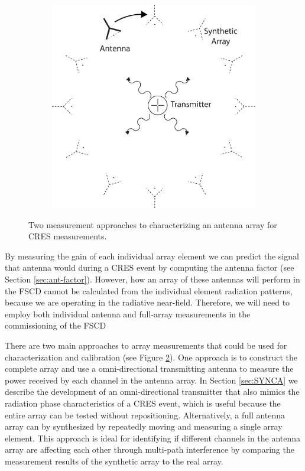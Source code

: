 \begin{figure}[htbp]
\begin{subfigure}[b]{0.4\textwidth}
        \includegraphics[width=1\textwidth]{figs/Chapter-5/230409_beamform_synth_array_meas.png}
        \caption{\label{fig:beam-synth-array-meas}}
    \end{subfigure}
    \hfill
    \caption{Two measurement approaches to characterizing an antenna array for CRES measurements.}
    \qquad
    \label{fig:array-measurements}
\end{figure}
By measuring the gain of each individual array element we can predict the signal that antenna would during a CRES event by computing the antenna factor (see Section \ref{sec:ant-factor}). However, how an array of these antennas will perform in the FSCD cannot be calculated from the individual element radiation patterns, because we are operating in the radiative near-field. Therefore, we will need to employ both individual antenna and full-array measurements in the commissioning of the FSCD

There are two main approaches to array measurements that could be used for characterization and calibration (see Figure \ref{fig:array-measurements}). One approach is to construct the complete array and use a omni-directional transmitting antenna to measure the power received by each channel in the antenna array. In Section \ref{sec:SYNCA} we describe the development of an omni-directional transmitter that also mimics the radiation phase characteristics of a CRES event, which is useful because the entire array can be tested without repositioning. Alternatively, a full antenna array can by synthesized by repeatedly moving and measuring a single array element. This approach is ideal for identifying if different channels in the antenna array are affecting each other through multi-path interference by comparing the measurement results of the synthetic array to the real array. 

